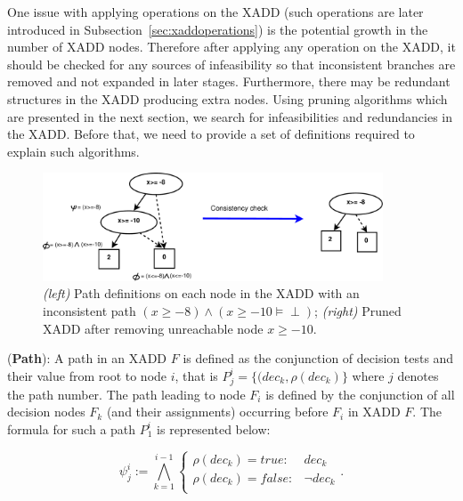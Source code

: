 \documentclass[twoside,11pt]{article}
\newenvironment{mydef}[1][Definition]{\begin{trivlist}
\item[\hskip \labelsep {\bfseries #1}]}{\end{trivlist}}
\begin{document}
One issue with applying operations on the XADD (such operations are later introduced in Subsection~\ref{sec:xaddoperations}) is the potential growth in the number of XADD nodes. Therefore after applying any operation on the XADD, it should be checked for any sources of infeasibility so that inconsistent branches are removed and not expanded in later stages. Furthermore, there may be redundant structures in the XADD producing extra nodes. Using pruning algorithms which are presented in the next section, we search for infeasibilities and redundancies in the XADD. Before that, we need to provide a set of definitions required to explain such algorithms.
\begin{figure}[t!]
\centering
\includegraphics[width=0.9\textwidth]{pics/pruningC.pdf}
\vspace{-2mm}
\caption{%
{\it (left)} Path definitions on each node in the XADD with an inconsistent path $(x \geq -8) \wedge (x \geq -10 \models\perp)$; {\it (right)} Pruned XADD after removing unreachable node $x \geq -10$.}
\label{fig:consistent_graph}
\end{figure}
\begin{mydef}(\textbf{Path}):
A path in an XADD $F$ is defined as the conjunction of decision tests and their value from root to node $i$, that is $P_j^i = \lbrace (dec_k, \rho(dec_k)\rbrace$ where $j$ denotes the path number. 
The path leading to node $F_i$ is defined by the conjunction of all decision nodes $F_k$ (and their assignments) occurring before $F_i$ in XADD $F$. The formula for such a path $P_1^i$ is represented below:

\begin{equation}
\psi_j^{i} := \bigwedge_{k=1}^{i-1}
\begin{cases}
\rho(\mathit{dec}_k) = \mathit{true}: & \mathit{dec}_k\\ 
\rho(\mathit{dec}_k) = \mathit{false}: & \neg \mathit{dec}_k \\ 
\end{cases}. \label{eq:path}%
\end{equation}
\end{mydef}
\end{document}
